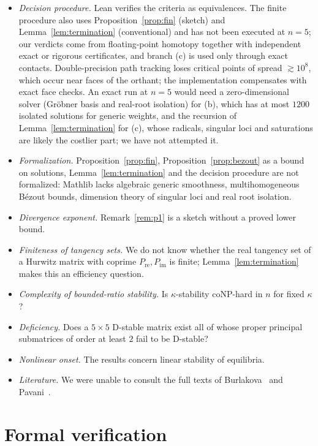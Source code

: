 \documentclass[11pt,a4paper]{article}
\theoremstyle{plain}
\theoremstyle{definition}
\newcommand{\Pre}{P_{\mathrm{re}}}
\newcommand{\Pim}{P_{\mathrm{im}}}
\begin{document}
\begin{itemize}
\item \emph{Decision procedure.} Lean verifies the criteria as equivalences. The finite procedure also uses
Proposition~\ref{prop:fin} (sketch) and Lemma~\ref{lem:termination} (conventional) and has not been executed at $n=5$;
our verdicts come from floating-point homotopy together with independent exact or rigorous certificates, and branch (c)
is used only through exact contacts. Double-precision path tracking loses critical points of spread $\gtrsim10^8$, which
occur near faces of the orthant; the implementation compensates with exact face checks. An exact run at $n=5$
would need a zero-dimensional solver (Gr\"obner basis and real-root isolation) for (b), which has at most $1200$
isolated solutions for generic weights, and the recursion of Lemma~\ref{lem:termination} for (c), whose radicals,
singular loci and saturations are likely the costlier part; we have not attempted it.
\item \emph{Formalization.} Proposition~\ref{prop:fin}, Proposition~\ref{prop:bezout} as a bound on solutions,
Lemma~\ref{lem:termination} and the decision procedure are not formalized: Mathlib lacks algebraic generic
smoothness, multihomogeneous B\'ezout bounds, dimension theory of singular loci and real root isolation.
\item \emph{Divergence exponent.} Remark~\ref{rem:p1} is a sketch without a proved lower bound.
\item \emph{Finiteness of tangency sets.} We do not know whether the real tangency set of a Hurwitz matrix with coprime
$\Pre,\Pim$ is finite; Lemma~\ref{lem:termination} makes this an efficiency question.
\item \emph{Complexity of bounded-ratio stability.} Is $\kappa$-stability coNP-hard in $n$ for fixed $\kappa$?
\item \emph{Deficiency.} Does a $5\times5$ D-stable matrix exist all of whose proper principal submatrices of order at
least $2$ fail to be D-stable?
\item \emph{Nonlinear onset.} The results concern linear stability of equilibria.
\item \emph{Literature.} We were unable to consult the full texts of Burlakova~\cite{Burlakova2009} and
Pavani~\cite{Pavani2018,Pavani2019}.
\end{itemize}

\section{Formal verification}\label{sec:lean}
\end{document}
